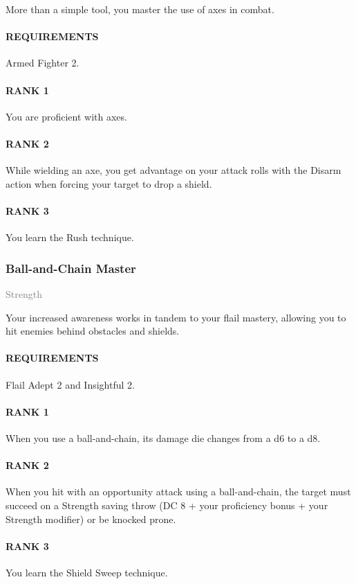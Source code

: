 \normalsize
More than a simple tool, you master the use of axes in combat.
\paragraph{REQUIREMENTS} Armed Fighter 2.
\paragraph{RANK 1} You are proficient with axes.
\paragraph{RANK 2} While wielding an axe, you get advantage on your attack rolls with the Disarm action when forcing your target to drop a shield.
\paragraph{RANK 3} You learn the Rush technique.

\subsubsection{Ball-and-Chain Master} \label{feat::ballandchainmaster}
\small{\textcolor{gray}{Strength}}

\normalsize
Your increased awareness works in tandem to your flail mastery, allowing you to hit enemies behind obstacles and shields.
\paragraph{REQUIREMENTS} Flail Adept 2 and Insightful 2.
\paragraph{RANK 1} When you use a ball-and-chain, its damage die changes from a d6 to a d8.
\paragraph{RANK 2} When you hit with an opportunity attack using a ball-and-chain, the target must succeed on a Strength saving throw (DC 8 + your proficiency bonus + your Strength modifier) or be knocked prone.
\paragraph{RANK 3} You learn the Shield Sweep technique.

